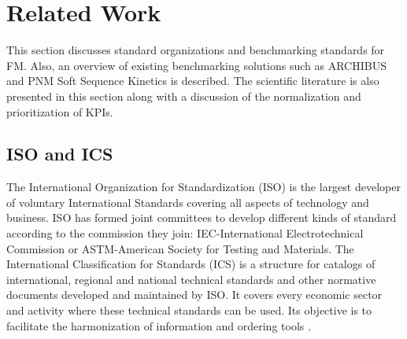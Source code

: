 
% 
% 

\section{Related Work}
\label{RelatedWork}

This section discusses standard organizations and benchmarking standards for FM. Also, an overview of existing benchmarking solutions such as ARCHIBUS and PNM Soft Sequence Kinetics is described. The scientific literature is also presented in this section along with a discussion of the normalization and prioritization of KPIs. 


\subsection{ISO and ICS}
The International Organization for Standardization (ISO) is the largest developer of voluntary International Standards covering all aspects of technology and business. ISO has formed joint committees to develop different kinds of standard according to the commission they join: IEC-International Electrotechnical Commission or ASTM-American Society for Testing and Materials. 
The International Classification for Standards (ICS) is a structure for catalogs of international, regional and national technical standards and other normative documents developed and maintained by ISO. It covers every economic sector and activity where these technical standards can be used. Its objective is to facilitate the harmonization of information and ordering tools \cite{ICS2005}.

